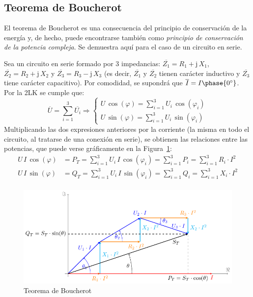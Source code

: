 \subsection{Teorema de Boucherot}\label{sec:boucherot}
El teorema de Boucherot es una consecuencia del principio de
conservación de la energía y, de hecho, puede encontrarse también como
\textit{principio de conservación de la potencia compleja}. Se
demuestra aquí para el caso de un circuito en serie.
	
Sea un circuito en serie formado por 3 impedancias:
$\overline{Z_1}=R_1+\mathrm{j}\,X_1$,
$\overline{Z_2}=R_2+\mathrm{j}\,X_2$ y
$\overline{Z_3}=R_3-\mathrm{j}\,X_3$ (es decir, $\overline{Z_1}$ y
$\overline{Z_2}$ tienen carácter inductivo y $\overline{Z_3}$ tiene
carácter capacitivo). Por comodidad, se supondrá que
$\overline{I}=I\phase{0^\circ}$. Por la 2LK se cumple que:
\begin{equation*}
  \overline{U}=\sum_{i=1}^3 \overline{U_i}\Rightarrow
  \begin{cases}
    U\,\cos(\varphi)=\displaystyle\sum_{i=1}^3 U_i\,\cos(\varphi_i)\\
    U\,\sin(\varphi)=\displaystyle\sum_{i=1}^3 U_i\,\sin(\varphi_i)
  \end{cases}
\end{equation*}
Multiplicando las dos expresiones anteriores por la corriente (la
misma en todo el circuito, al tratarse de una conexión en serie), se
obtienen las relaciones entre las potencias, que puede verse
gráficamente en la Figura~\ref{fig:boucherot}:
\begin{align*}
  U\,I\,\cos(\varphi)&=P_T=\displaystyle\sum_{i=1}^3 U_i\,I\,\cos(\varphi_i)=\displaystyle\sum_{i=1}^3 P_i=\displaystyle\sum_{i=1}^3 R_i\cdot I^2\\
  U\,I\,\sin(\varphi)&=Q_T=\displaystyle\sum_{i=1}^3 U_i\,I\,\sin(\varphi_i)=\displaystyle\sum_{i=1}^3 Q_i=\displaystyle\sum_{i=1}^3 X_i\cdot I^2\\
\end{align*}
\begin{figure}[H]
  \centering
  \includegraphics[width=0.7\linewidth]{../figs/boucherot.pdf}
  \caption{Teorema de Boucherot}
  \label{fig:boucherot}
\end{figure}
	
